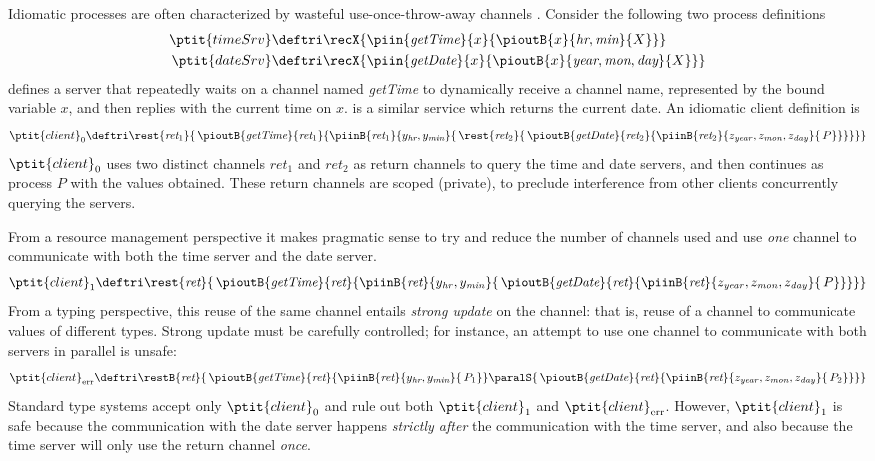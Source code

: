 \documentclass[copyright]{eptcs}
\begin{document}
Idiomatic \pic processes are often characterized by wasteful
use-once-throw-away channels \cite{Milner:Pi,KobayashiPT:linearity}.  Consider
the following two \pic process definitions
\begin{align*}
\ptit{timeSrv} &\deftri \recX{\piin{\textit{getTime}}{x}{\pioutB{x}{\textit{hr}, \textit{min}}{X}}} \\ 
\ptit{dateSrv} &\deftri \recX{\piin{\textit{getDate}}{x}{\pioutB{x}{\textit{year}, \textit{mon}, \textit{day}}{X}}}
\end{align*} 
 defines a server that repeatedly waits on a channel named
\textit{getTime} to dynamically receive a channel name, represented by
the bound variable $x$, and then replies with the current time on $x$.
 is a similar service which returns the current date.  An
idiomatic \pic client definition is
\begin{equation*}
  \ptit{client}_0 \deftri \rest{\textit{ret}_1}{\,\pioutB{\textit{getTime}}{\textit{ret}_1}{\piinB{\textit{ret}_1}{y_\textit{hr}, y_\textit{min}}{\,\rest{\textit{ret}_2}{\,\pioutB{\textit{getDate}}{\textit{ret}_2}{\piinB{\textit{ret}_2}{z_\mathit{year}, z_\mathit{mon}, z_\mathit{day}}{\,P}}}}}}
\end{equation*}
$\ptit{client}_0$ uses two distinct channels $\textit{ret}_1$ and
$\textit{ret}_2$ as return channels to query the time and date servers, and
then continues as process $P$ with the values obtained. These return
channels are scoped (private), to preclude interference from other clients
concurrently querying the servers.  

From a resource management perspective it makes pragmatic sense to try and
reduce the number of channels used and use \emph{one} channel to communicate
with both the time server and the date server. 
\begin{equation*} \ptit{client}_1 \deftri
\rest{\textit{ret}}{\,\pioutB{\textit{getTime}}{\textit{ret}}{\piinB{\textit{ret}}{y_\mathit{hr}, y_\mathit{min}}{\,\pioutB{\textit{getDate}}{\textit{ret}}{\piinB{\textit{ret}}{z_\mathit{year}, z_\mathit{mon}, z_\mathit{day}}{\,P}}}}}
\end{equation*}
From a typing perspective, this reuse of the same channel entails \emph{strong
update} on the channel: that is, reuse of a channel to communicate values of
different types. Strong update must be carefully controlled; for instance, an
attempt to use one channel to communicate with both servers in parallel is
unsafe:
\begin{equation*}
  \ptit{client}_\text{err} \deftri \restB{\textit{ret}}{\,\pioutB{\textit{getTime}}{\textit{ret}}{\piinB{\textit{ret}}{y_\textit{hr}, y_\textit{min}}{\,P_1}} \paralS {\,\pioutB{\textit{getDate}}{\textit{ret}}{\piinB{\textit{ret}}{z_\mathit{year}, z_\mathit{mon}, z_\mathit{day}}{\,P_2}}}}
\end{equation*}
Standard \pic type systems accept only $\ptit{client}_0$ and rule out both
$\ptit{client}_1$ and $\ptit{client}_\text{err}$. However, $\ptit{client}_1$ is
safe because the communication with the date server happens \emph{strictly after}  the
communication with the time server, and also because the time server will only use the
return channel \emph{once}. 
\end{document}
